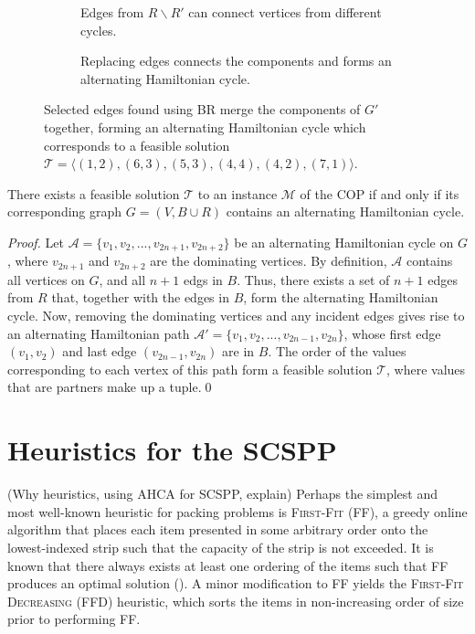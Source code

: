 \documentclass[oribibl]{llncs}
\begin{document}
\begin{figure}	
	\centering
	\begin{subfigure}[H]{0.5\textwidth}
		
		\caption{Edges from $R\backslash R'$ can connect vertices from different cycles.}	
		\label{fig:mpsconnect}
	\end{subfigure}
	\begin{subfigure}[H]{0.5\textwidth}
		
		\caption{Replacing edges connects the components and forms an alternating Hamiltonian cycle.}	
		\label{fig:mpscycle}
	\end{subfigure}
	\caption{Selected edges found using BR merge the components of $G'$ together, forming an alternating Hamiltonian cycle which corresponds to a feasible solution $\mathcal{T} = \langle(1,2), (6,3), (5,3), (4,4), (4,2), (7,1) \rangle$.}
	\label{fig:connect/cycle}
\end{figure}


\begin{theorem}
	\label{thm:copsoln}
	There exists a feasible solution $\mathcal{T}$ to an instance $\mathcal{M}$ of the COP if and only if its corresponding graph $G=(V, B\cup R)$ contains an alternating Hamiltonian cycle.
\end{theorem}
\begin{proof}
	Let $\mathcal{A} = \{v_1, v_2, ..., v_{2n+1}, v_{2n+2}\}$ be an alternating Hamiltonian cycle on $G$, where $v_{2n+1}$ and $v_{2n+2}$ are the dominating vertices. By definition, $\mathcal{A}$ contains all vertices on $G$, and all $n+1$ edgs in $B$. Thus, there exists a set of $n+1$ edges from $R$ that, together with the edges in $B$, form the alternating Hamiltonian cycle. Now, removing the dominating vertices and any incident edges gives rise to an alternating Hamiltonian path $\mathcal{A}' = \{v_1, v_2, ..., v_{2n-1}, v_{2n}\}$, whose first edge $(v_1, v_2)$ and last edge $(v_{2n-1}, v_{2n})$ are in $B$. The order of the values corresponding to each vertex of this path form a feasible solution $\mathcal{T}$, where values that are partners make up a tuple.\qed
\end{proof}


\section{Heuristics for the SCSPP}
\label{sec:scsppsoln}

(Why heuristics, using AHCA for SCSPP, explain) Perhaps the simplest and most well-known heuristic for packing problems is \textsc{First-Fit} (FF), a greedy online algorithm that places each item presented in some arbitrary order onto the lowest-indexed strip such that the capacity of the strip is not exceeded. It is known that there always exists at least one ordering of the items such that FF produces an optimal solution (\citealp{lewis2009}). A minor modification to FF yields the \textsc{First-Fit Decreasing} (FFD) heuristic, which sorts the items in non-increasing order of size prior to performing FF.
\end{document}
